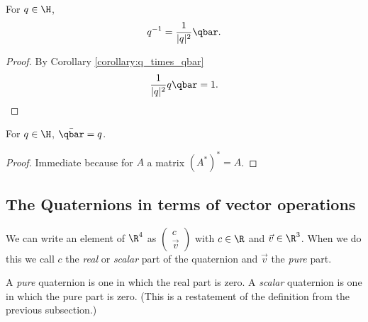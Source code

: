 \documentclass[oneside,12pt]{amsart}
\begin{document}
 \begin{corollary}
 \label{corollary:q_inverse_by_qbar}
 For $q\in\H$, 
 $$q^{-1} = \frac{1}{|q|^2} \qbar.$$
 \end{corollary}
 \begin{proof}
 By Corollary \ref{corollary:q_times_qbar}
 $$\frac{1}{|q|^2} q \qbar = 1.$$ 
 \end{proof}

 \begin{lemma}
 For $q\in\H$, $\bar{\qbar} = q$.
 \end{lemma}
 \begin{proof}
 Immediate because for $A$ a matrix $(A^{*})^{*} = A$.
 \end{proof}

\subsection{The Quaternions in terms of vector operations}

We can write an element of $\R^4$ as
$\begin{pmatrix}
c\\
\vec{v}
\end{pmatrix}$ with $c\in \R$ and $\vec{v}\in\R^3$. When
we do this we call $c$ the \emph{real} or \emph{scalar}
part of the quaternion and $\vec{v}$ the \emph{pure} part. 

\begin{definition}
A \emph{pure} quaternion is one in which the real part is zero.
A \emph{scalar} quaternion is one in which the pure part is zero.
(This is a restatement of the definition from the previous subsection.)
\end{definition}
\end{document}
